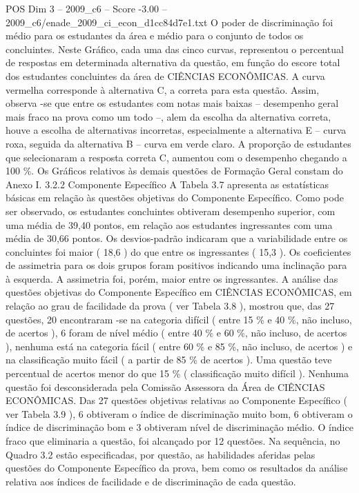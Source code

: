 \begin{textsample}{POS Dim 3 – 2009\_c6 – Score -3.00 – 2009\_c6/enade\_2009\_ci\_econ\_d1cc84d7e1.txt}
O poder de discriminação foi médio para os estudantes da área e médio para o conjunto de todos os concluintes.
Neste Gráfico, cada uma das cinco curvas, representou o percentual de respostas em determinada alternativa da questão, em função do escore total dos estudantes concluintes da área de CIÊNCIAS ECONÔMICAS.
A curva vermelha corresponde à alternativa C, a correta para esta questão.
Assim, observa -se que entre os estudantes com notas mais baixas – desempenho geral mais fraco na prova como um todo –, alem da escolha da alternativa correta, houve a escolha de alternativas incorretas, especialmente a alternativa E – curva roxa, seguida da alternativa B – curva em verde claro.
A proporção de estudantes que selecionaram a resposta correta C, aumentou com o desempenho chegando a 100 \%.
Os Gráficos relativos às demais questões de Formação Geral constam do Anexo I. 3.2.2 Componente Específico A Tabela 3.7 apresenta as estatísticas básicas em relação às questões objetivas do Componente Específico.
Como pode ser observado, os estudantes concluintes obtiveram desempenho superior, com uma média de 39,40 pontos, em relação aos estudantes ingressantes com uma média de 30,66 pontos.
Os desvios-padrão indicaram que a variabilidade entre os concluintes foi maior ( 18,6 ) do que entre os ingressantes ( 15,3 ).
Os coeficientes de assimetria para os dois grupos foram positivos indicando uma inclinação para à esquerda.
A assimetria foi, porém, maior entre os ingressantes.
A análise das questões objetivas do Componente Específico em CIÊNCIAS ECONÔMICAS, em relação ao grau de facilidade da prova ( ver Tabela 3.8 ), mostrou que, das 27 questões, 20 encontraram -se na categoria difícil ( entre 15 \% e 40 \%, não incluso, de acertos ), 6 foram de nível médio ( entre 40 \% e 60 \%, não incluso, de acertos ), nenhuma está na categoria fácil ( entre 60 \% e 85 \%, não incluso, de acertos ) e na classificação muito fácil ( a partir de 85 \% de acertos ).
Uma questão teve percentual de acertos menor do que 15 \% ( classificação muito difícil ).
Nenhuma questão foi desconsiderada pela Comissão Assessora da Área de CIÊNCIAS ECONÔMICAS.
Das 27 questões objetivas relativas ao Componente Específico ( ver Tabela 3.9 ), 6 obtiveram o índice de discriminação muito bom, 6 obtiveram o índice de discriminação bom e 3 obtiveram nível de discriminação médio.
O índice fraco que eliminaria a questão, foi alcançado por 12 questões.
Na sequência, no Quadro 3.2 estão especificadas, por questão, as habilidades aferidas pelas questões do Componente Específico da prova, bem como os resultados da análise relativa aos índices de facilidade e de discriminação de cada questão.

\end{textsample}
